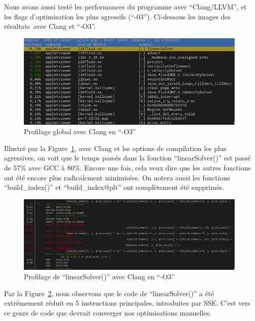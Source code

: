 \documentclass[12pt,a4paper]{article}
\begin{document}
Nous avons aussi testé les performances du programme avec
\enquote{Clang/\ac{LLVM}}, et les flags d'optimisation les plus agressifs
(\enquote{-03}). Ci-dessous les images des résultats avec Clang et \enquote{-O3}.

\begin{figure}
    \centering
    \includegraphics[scale=0.58]{figures/optims/clang-O3/global.png}
    \caption{Profilage global avec Clang en \enquote{-O3}}
    \label{fig.optim.compil.clang.global}
\end{figure}

Illustré par la Figure~\ref{fig.optim.compil.clang.global}, avec Clang et
les options de compilation les plus agressives, on voit que le temps passés dans
la fonction \enquote{linearSolver()} est passé de 57\% avec \ac{GCC} à 80\%.
Encore une fois, cela veux dire que les autres fonctions ont été encore plus
radicalement minimisées. On notera aussi les fonctions \enquote{build\_index()}
et \enquote{build\_index@plt} ont complètement été supprimés.

\begin{figure}
    \centering
    \includegraphics[scale=0.35]{figures/optims/clang-O3/linearSolver.png}
    \caption{Profilage de \enquote{linearSolver()} avec Clang en \enquote{-O3}}
    \label{fig.optim.compil.clang.linearSolver}
\end{figure}

Par la Figure~\ref{fig.optim.compil.clang.linearSolver}, nous observons que le
code de \enquote{linearSolver()} a été extrêmement réduit en 5 instructions
principales, introduites par \ac{SSE}. C'est vers ce genre de code que devrait
converger nos optimisations manuelles.
\end{document}
